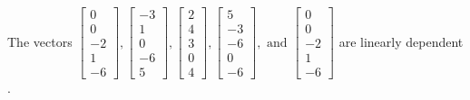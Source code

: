 \begin{exercise}
\begin{exerciseStatement}
  \end{exerciseStatement}
  \begin{exerciseAnswer}
   The vectors \(\left[\begin{array}{r}
0 \\
0 \\
-2 \\
1 \\
-6
\end{array}\right] , \left[\begin{array}{r}
-3 \\
1 \\
0 \\
-6 \\
5
\end{array}\right] , \left[\begin{array}{r}
2 \\
4 \\
3 \\
0 \\
4
\end{array}\right] , \left[\begin{array}{r}
5 \\
-3 \\
-6 \\
0 \\
-6
\end{array}\right] , \text{ and } \left[\begin{array}{r}
0 \\
0 \\
-2 \\
1 \\
-6
\end{array}\right]\) are 
  	 linearly dependent  .
  


  \end{exerciseAnswer}
\end{exercise}